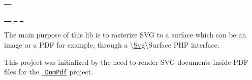 \href{https://travis-ci.org/PhenX/php-svg-lib}{\texttt{ }} \href{https://coveralls.io/r/PhenX/php-svg-lib}{\texttt{ }}

\href{https://packagist.org/packages/phenx/php-svg-lib}{\texttt{ }} \href{https://packagist.org/packages/phenx/php-svg-lib}{\texttt{ }} \href{https://packagist.org/packages/phenx/php-svg-lib}{\texttt{ }} \href{https://packagist.org/packages/phenx/php-svg-lib}{\texttt{ }}

The main purpose of this lib is to rasterize SVG to a surface which can be an image or a PDF for example, through a {\ttfamily \textbackslash{}\mbox{\hyperlink{namespace_svg}{Svg}}\textbackslash{}Surface} PHP interface.

This project was initialized by the need to render SVG documents inside PDF files for the \href{http://dompdf.github.io}{\texttt{ Dom\+Pdf}} project. 